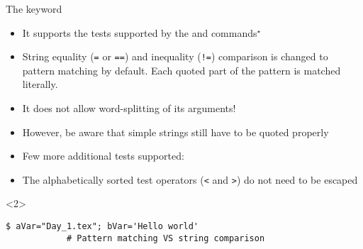 \begin{frame}[fragile]{The \bash{[[} keyword}
    \vspace{-2mm}
    \begin{itemize}[<only@1>]
        \item It supports the tests supported by the  and \bash{[} commands$^{\star}$
        \item String equality (\texttt{=} or \texttt{==}) and inequality (\texttt{!=}) comparison is changed to \alert{pattern matching} by default.
              Each quoted part of the pattern is matched literally.
        \item \alert{It does not allow word-splitting} of its arguments!
        \item However, be aware that simple strings still have to be quoted properly
        \item Few more additional tests supported:
        \item The alphabetically sorted test operators (\texttt{<} and \texttt{>}) do not need to be escaped
    \end{itemize}
    \begin{onlyenv}<2>
        \begin{lstlisting}[style=MyBash, aboveskip=-1mm, style=oddnumbers, style=smaller, xleftmargin=1mm, xrightmargin=1mm]
            $ aVar="Day_1.tex"; bVar='Hello world'
            # Pattern matching VS string comparison

\end{lstlisting}
\end{onlyenv}
\end{frame}
